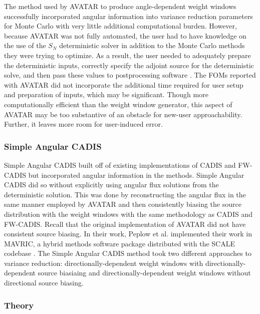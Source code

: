The method used by AVATAR to produce angle-dependent weight windows successfully
incorporated angular information into variance reduction parameters for Monte Carlo
with very little additional computational burden. However, because AVATAR
was not fully automated, the user had to have knowledge on the use of the $S_N$
deterministic solver in addition to the Monte Carlo methods they were trying to
optimize. As a result, the user needed to adequately prepare the deterministic
inputs, correctly specify the adjoint source for the deterministic solve, and
then pass these values to postprocessing software \cite{peplow_consistent_2012,
evans_enhanced_1998}. The FOMs reported with AVATAR did not incorporate the
additional time required for user setup and preparation of inputs, which may be
significant. Though more computationally efficient than the weight window generator,
this aspect of AVATAR may be too substantive of an obstacle for new-user
approachability. Further, it leaves more room for user-induced error.
%
%

\subsubsection{Simple Angular CADIS}

Simple Angular CADIS \cite{peplow_consistent_2012} built off of existing
implementations
of CADIS and FW-CADIS but incorporated angular information in the
methods. Simple Angular CADIS did so without explicitly using
angular flux solutions from the deterministic solution.
This was done by reconstructing the angular flux in the same manner employed by
AVATAR and then consistently
biasing the
source distribution with the weight windows with the same methodology as CADIS
and FW-CADIS. Recall that the original
implementation of AVATAR did not have consistent source biasing.
In their work, Peplow et al. implemented their
work in MAVRIC, a hybrid methods software package distributed with the SCALE
codebase \cite{SCALE6_1}. The Simple Angular CADIS method took two different
approaches to variance reduction:
directionally-dependent weight windows with directionally-dependent source
biasiaing and directionally-dependent weight windows without directional source
biasing.

\subsubsection*{Theory}

